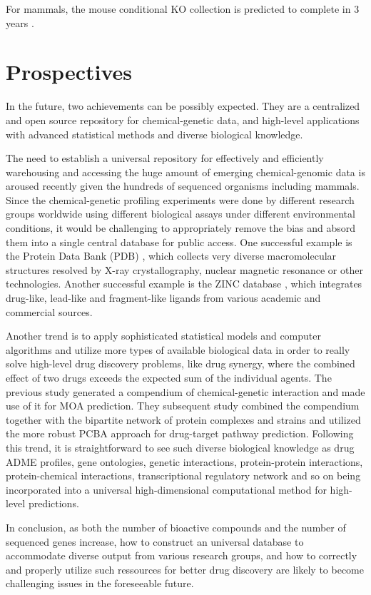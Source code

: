 \documentclass[12pt,fullpage,singlespace]{article}
\begin{document}
For mammals, the mouse conditional KO collection is predicted to complete in 3 years \citep{1082}.

\section{Prospectives}

In the future, two achievements can be possibly expected. They are a centralized and open source repository for chemical-genetic data, and high-level applications with advanced statistical methods and diverse biological knowledge.

The need to establish a universal repository for effectively and efficiently warehousing and accessing the huge amount of emerging chemical-genomic data is aroused recently given the hundreds of sequenced organisms including mammals. Since the chemical-genetic profiling experiments were done by different research groups worldwide using different biological assays under different environmental conditions, it would be challenging to appropriately remove the bias and absord them into a single central database for public access. One successful example is the Protein Data Bank (PDB) \citep{105}, which collects very diverse macromolecular structures resolved by X-ray crystallography, nuclear magnetic resonance or other technologies. Another successful example is the ZINC database \citep{532}, which integrates drug-like, lead-like and fragment-like ligands from various academic and commercial sources.

Another trend is to apply sophisticated statistical models and computer algorithms and utilize more types of available biological data in order to really solve high-level drug discovery problems, like drug synergy, where the combined effect of two drugs exceeds the expected sum of the individual agents. The previous study \citep{1078}  generated a compendium of chemical-genetic interaction and made use of it for MOA prediction. They subsequent study \citep{1079} combined the compendium together with the bipartite network of protein complexes and strains and utilized the more robust PCBA approach for drug-target pathway prediction. Following this trend, it is straightforward to see such diverse biological knowledge as drug ADME profiles, gene ontologies, genetic interactions, protein-protein interactions, protein-chemical interactions, transcriptional regulatory network and so on being incorporated into a universal high-dimensional computational method for high-level predictions.

In conclusion, as both the number of bioactive compounds and the number of sequenced genes increase, how to construct an universal database to accommodate diverse output from various research groups, and how to correctly and properly utilize such ressources for better drug discovery are likely to become challenging issues in the foreseeable future.



\end{document}
